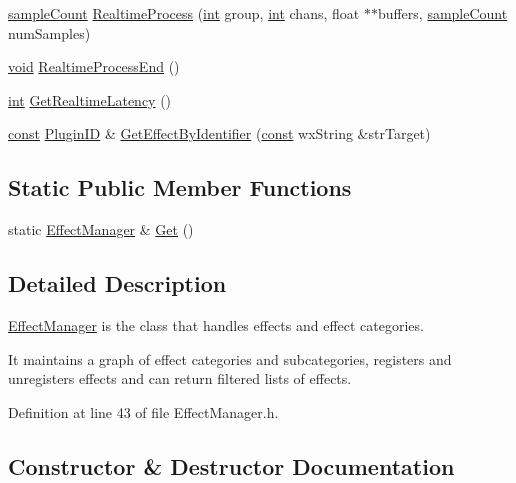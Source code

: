 \begin{DoxyCompactItemize}
\item 
\hyperlink{include_2audacity_2_types_8h_afa427e1f521ea5ec12d054e8bd4d0f71}{sample\+Count} \hyperlink{class_effect_manager_ae270db06f6e8311958934d45877c6220}{Realtime\+Process} (\hyperlink{xmltok_8h_a5a0d4a5641ce434f1d23533f2b2e6653}{int} group, \hyperlink{xmltok_8h_a5a0d4a5641ce434f1d23533f2b2e6653}{int} chans, float $\ast$$\ast$buffers, \hyperlink{include_2audacity_2_types_8h_afa427e1f521ea5ec12d054e8bd4d0f71}{sample\+Count} num\+Samples)
\item 
\hyperlink{sound_8c_ae35f5844602719cf66324f4de2a658b3}{void} \hyperlink{class_effect_manager_ab27a583e26afb401d8977ce8b6bf70d3}{Realtime\+Process\+End} ()
\item 
\hyperlink{xmltok_8h_a5a0d4a5641ce434f1d23533f2b2e6653}{int} \hyperlink{class_effect_manager_adaab0f223dea9b76477caf0a94ad5d6b}{Get\+Realtime\+Latency} ()
\item 
\hyperlink{getopt1_8c_a2c212835823e3c54a8ab6d95c652660e}{const} \hyperlink{include_2audacity_2_types_8h_abe9b737fcebc2b5bea606246e1eab52e}{Plugin\+ID} \& \hyperlink{class_effect_manager_a60f2751a059eb7091435a4be52ab6548}{Get\+Effect\+By\+Identifier} (\hyperlink{getopt1_8c_a2c212835823e3c54a8ab6d95c652660e}{const} wx\+String \&str\+Target)
\end{DoxyCompactItemize}
\subsection*{Static Public Member Functions}
\begin{DoxyCompactItemize}
\item 
static \hyperlink{class_effect_manager}{Effect\+Manager} \& \hyperlink{class_effect_manager_a6d9acb7546cc925cd8a2e9ceffa4dda0}{Get} ()
\end{DoxyCompactItemize}


\subsection{Detailed Description}
\hyperlink{class_effect_manager}{Effect\+Manager} is the class that handles effects and effect categories. 

It maintains a graph of effect categories and subcategories, registers and unregisters effects and can return filtered lists of effects. 

Definition at line 43 of file Effect\+Manager.\+h.



\subsection{Constructor \& Destructor Documentation}
